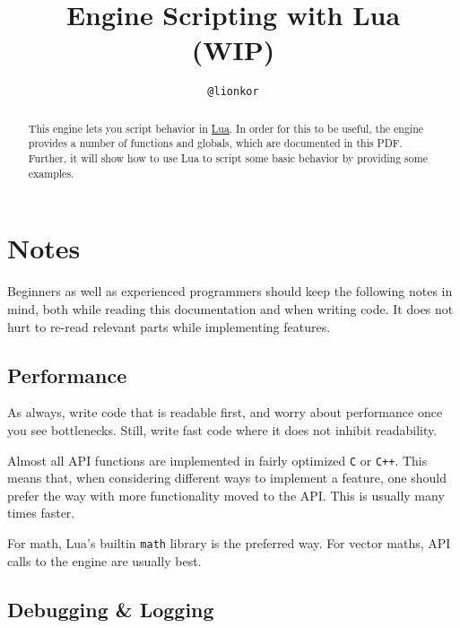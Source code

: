 \documentclass[12pt,a4paper]{article}
\title{Engine Scripting with Lua\\(WIP)}
\author{\texttt{@lionkor}}
\begin{document}
\begin{titlepage}
\clearpage\maketitle
\thispagestyle{empty}
\end{titlepage}


\tableofcontents
\pagebreak

\begin{abstract}

This engine lets you script behavior in \href{https://www.lua.org/about.html}{Lua}. 
In order for this to be useful, the engine provides a number of functions and globals, which are documented in this PDF. Further, it will show how to use Lua to script some basic behavior by providing some examples.

\end{abstract}

\pagebreak

\setcounter{page}{1}

\section{Notes}

Beginners as well as experienced programmers should keep the following notes in mind, both while reading this documentation and when writing code. It does not hurt to re-read relevant parts while implementing features.

\subsection{Performance}

As always, write code that is readable first, and worry about performance once you see bottlenecks. Still, write fast code where it does not inhibit readability.

Almost all API functions are implemented in fairly optimized \texttt{C} or \texttt{C++}. This means that, when considering different ways to implement a feature, one should prefer the way with more functionality moved to the API. This is usually many times faster.

For math, Lua's builtin \texttt{math} library is the preferred way. For vector maths, API calls to the engine are usually best.

\subsection{Debugging \& Logging}
\end{document}
